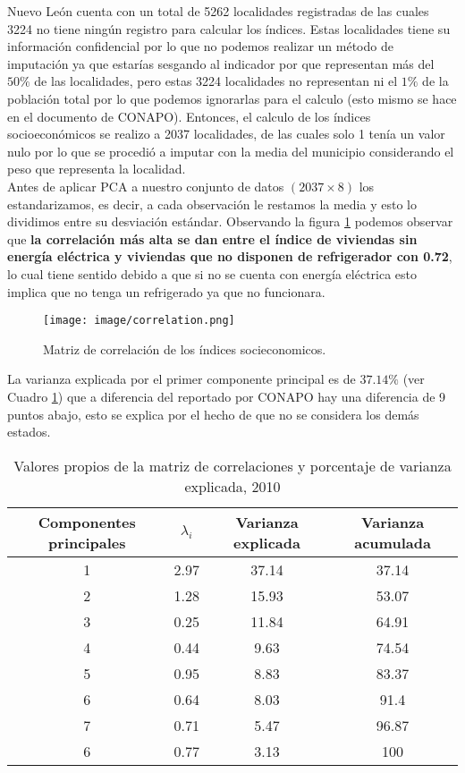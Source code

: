 \documentclass[paper=letter, fontsize=11pt]{scrartcl}
\numberwithin{equation}{section} %
\numberwithin{figure}{section} %
\numberwithin{table}{section} %
\begin{document}
Nuevo León cuenta con un total de 5262 localidades registradas de las cuales 3224 no tiene ningún registro para calcular los índices. Estas localidades tiene su información confidencial por lo que no podemos realizar un método de imputación ya que estarías sesgando al indicador por que representan más del $50\%$ de las localidades, pero estas 3224 localidades no representan ni el $1\%$ de la población total por lo que podemos ignorarlas para el calculo (esto mismo se hace en el documento de CONAPO). Entonces, el calculo de los índices socioeconómicos se realizo a 2037 localidades, de las cuales solo 1 tenía un valor nulo por lo que se procedió a imputar con la media del municipio considerando el peso que representa la localidad. \\

Antes de aplicar PCA a nuestro conjunto de datos $(2037\times 8)$ los estandarizamos, es decir, a cada observación le restamos la media y esto lo dividimos entre su desviación estándar. Observando la figura \ref{fig:correlaltion} podemos observar que \textbf{la correlación más alta se dan entre el índice de viviendas sin energía eléctrica y viviendas que no disponen de refrigerador con 0.72}, lo cual tiene sentido debido a que si no se cuenta con energía eléctrica esto implica que no tenga un refrigerado ya que no funcionara. 
\begin{figure}[H]
    \centering
    \texttt{[image: image/correlation.png]}
    \caption{Matriz de correlación de los índices socieconomicos.}
    \label{fig:correlaltion}
\end{figure}
La varianza explicada por el primer componente principal es de $37.14\%$ (ver Cuadro \ref{tab:var_explicada}) que a diferencia del reportado por CONAPO hay una diferencia de 9 puntos abajo, esto se explica por el hecho de que no se considera los demás estados. 
\begin{table}[H]
    \centering
    \begin{tabular}{cccc}
        Componentes principales& $\lambda_i$ & Varianza explicada & Varianza acumulada  \\ \hline \hline
        1 & 2.97 & 37.14 &37.14\\
        2 & 1.28 & 15.93 &53.07\\
        3 & 0.25 & 11.84 &64.91\\
        4 & 0.44 &  9.63 &74.54\\
        5 & 0.95 &  8.83 &83.37\\
        6 & 0.64 &  8.03 &91.4\\ 
        7 & 0.71 &  5.47 &96.87\\
        6 & 0.77 &  3.13 &100\\ \hline \hline 
    \end{tabular}
    \caption{Valores propios de la matriz de correlaciones y porcentaje de varianza explicada, 2010}
    \label{tab:var_explicada}
\end{table}
\end{document}
